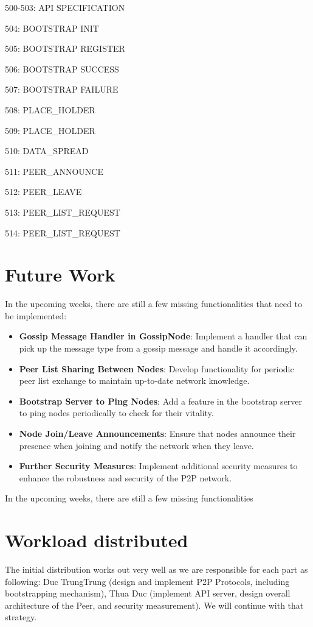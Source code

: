 500-503: API SPECIFICATION

504: BOOTSTRAP INIT

505: BOOTSTRAP REGISTER

506: BOOTSTRAP SUCCESS

507: BOOTSTRAP FAILURE


508: PLACE\_HOLDER

509: PLACE\_HOLDER


510: DATA\_SPREAD

511: PEER\_ANNOUNCE

512: PEER\_LEAVE

513: PEER\_LIST\_REQUEST

514: PEER\_LIST\_REQUEST


\section{Future Work}

In the upcoming weeks, there are still a few missing functionalities that need to be implemented:

\begin{itemize}
    \item \textbf{Gossip Message Handler in GossipNode}: Implement a handler that can pick up the message type from a gossip message and handle it accordingly.
    \item \textbf{Peer List Sharing Between Nodes}: Develop functionality for periodic peer list exchange to maintain up-to-date network knowledge.
    \item \textbf{Bootstrap Server to Ping Nodes}: Add a feature in the bootstrap server to ping nodes periodically to check for their vitality.
    \item \textbf{Node Join/Leave Announcements}: Ensure that nodes announce their presence when joining and notify the network when they leave.
    \item \textbf{Further Security Measures}: Implement additional security measures to enhance the robustness and security of the P2P network.
\end{itemize}

In the upcoming weeks, there are still a few missing functionalities

\section{Workload distributed}

The initial distribution works out very well as we are responsible for each part as following: Duc TrungTrung (design and implement P2P Protocols, including bootstrapping mechanism), Thua Duc (implement API server, design overall architecture of the Peer, and security measurement). We will continue with that strategy.



